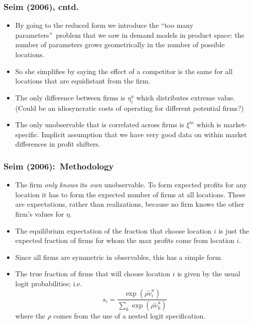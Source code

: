 \documentclass[aspectratio=169,11pt]{beamer}
\begin{document}
\begin{frame}
\frametitle{Seim (2006), cntd.}
\footnotesize
\begin{itemize}
\item By going to the reduced form we introduce the \textquotedblleft too
many parameters\textquotedblright\ problem that we saw in demand models in
product space: the number of parameters grows geometrically in the number of
possible locations.

\item So she simplifies by saying the effect of a competitor is the same for
all locations that are equidistant from the firm.

\item The only difference between firms is $\eta _{i}^{a}$ which distributes
extreme value. (Could be an idiosyncratic costs of operating for different
potential firms?)

\item The only unobservable that is correlated across firms is $\xi ^{m}$
which is market-specific. Implicit assumption that we have very good data on
within market differences in profit shifters.
\end{itemize}
\end{frame}

\begin{frame}
\frametitle{Seim (2006):\ Methodology}

\footnotesize
\begin{itemize}
\item The firm \textit{only knows} its \textit{own} unobservable. To form
expected profits for any location it has to form the expected number of
firms at all locations. These are expectations, rather than realizations,
because no firm knows the other firm's values for $\eta $.
\item The equilibrium expectation of the fraction that choose location $i$
is just the expected fraction of firms for whom the max profits come from
location $i.$
\item Since all firms are symmetric in observables, this has a simple form.
\item The true fraction of firms that will choose location $i$ is given by
the usual logit probabilities; i.e. 
\begin{equation*}
s_{i}=\frac{\exp (\rho \tilde{v}_{i}^{a})}{\sum_{k}\exp (\rho \tilde{v}%
_{k}^{a})}
\end{equation*}
where the $\rho $ comes from the use of a nested logit specification.
\end{itemize}
\end{frame}
\end{document}
